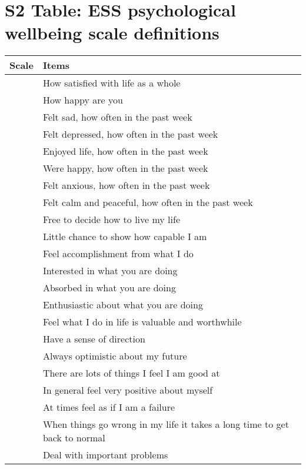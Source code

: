 \documentclass{article}
\begin{document}
\section*{S2 Table: ESS psychological wellbeing scale definitions}
\begin{table}[H]
\centering
\scriptsize
{}
\bgroup
\def\arraystretch{1.5}
\begin{tabular}{ll}
\hline
Scale & Items \\
\hline
\rowcolor{lightgray} & How satisfied with life as a whole \\
\rowcolor{lightgray}\multirow{-2}{*}{Evaluative wellbeing }& How happy are you\\

\rowcolor{white} & Felt sad, how often in the past week\\
\rowcolor{white} & Felt depressed, how often in the past week\\
\rowcolor{white} & Enjoyed life, how often in the past week\\
\rowcolor{white} & Were happy, how often in the past week\\
\rowcolor{white} & Felt anxious, how often in the past week\\
\rowcolor{white}\multirow{-6}{*}{Emotional wellbeing} & Felt calm and peaceful, how often in the past week\\

\rowcolor{lightgray} & Free to decide how to live my life\\
\rowcolor{lightgray} & Little chance to show how capable I am\\
\rowcolor{lightgray} & Feel accomplishment from what I do\\
\rowcolor{lightgray} & Interested in what you are doing\\
\rowcolor{lightgray} & Absorbed in what you are doing\\
\rowcolor{lightgray} & Enthusiastic about what you are doing\\
\rowcolor{lightgray} & Feel what I do in life is valuable and worthwhile\\
\rowcolor{lightgray} & Have a sense of direction\\
\rowcolor{lightgray} & Always optimistic about my future\\
\rowcolor{lightgray} & There are lots of things I feel I am good at\\
\rowcolor{lightgray} & In general feel very positive about myself\\
\rowcolor{lightgray} & At times feel as if I am a failure\\
\rowcolor{lightgray} & When things go wrong in my life it takes a long time to get back to normal\\
\rowcolor{lightgray}\multirow{-14}{*}{Functioning} & Deal with important problems\\


\end{tabular}
\end{table}
\end{document}
